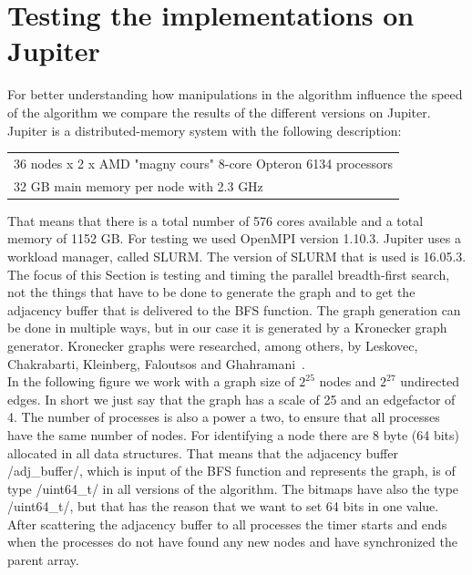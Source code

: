 \documentclass[12pt,a4paper]{article}
\begin{document}
\section{Testing the implementations on Jupiter}
\label{sec:testing}

For better understanding how manipulations in the algorithm influence the speed of the algorithm we compare the results of the different versions on Jupiter.
Jupiter is a distributed-memory system with the following description:
\begin{flushleft}
\begin{tabular}{| l |}
  \hline
  36 nodes x 2 x AMD "magny cours" 8-core Opteron 6134 processors \\
  32 GB main memory per node with 2.3 GHz\\
  \hline
\end{tabular}
\end{flushleft}
That means that there is a total number of 576 cores available and a total memory of 1152 GB. For testing we used OpenMPI version 1.10.3. Jupiter uses a workload manager, called SLURM. The version of SLURM that is used is 16.05.3.\\
The focus of this Section is testing and timing the parallel breadth-first search, not the things that have to be done to generate the graph and to get the adjacency buffer that is delivered to the BFS function. The graph generation can be done in multiple ways, but in our case it is generated by a Kronecker graph generator. Kronecker graphs were researched, among others, by Leskovec, Chakrabarti, Kleinberg, Faloutsos and Ghahramani~\cite{kronecker}.\\
In the following figure we work with a graph size of \(2^{25}\) nodes and \(2^{27}\) undirected edges. In short we just say that the graph has a scale of 25 and an edgefactor of 4. The number of processes is also a power a two, to ensure that all processes have the same number of nodes. For identifying a node there are 8 byte (64 bits) allocated in all data structures. That means that the adjacency buffer \cinline/adj_buffer/, which is input of the BFS function and represents the graph, is of type \cinline/uint64_t/ in all versions of the algorithm. The bitmaps have also the type \cinline/uint64_t/, but that has the reason that we want to set 64 bits in one value.\\
After scattering the adjacency buffer to all processes the timer starts and ends when the processes do not have found any new nodes and have synchronized the parent array.\\
\end{document}
